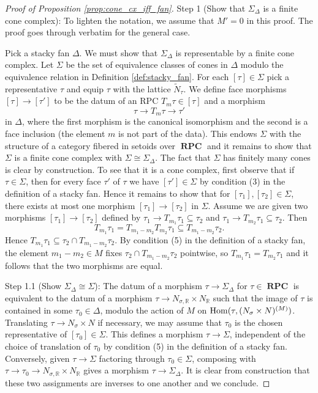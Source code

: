 \documentclass[10pt,a4paper]{amsart}
\DeclareMathOperator{\Hom}{\textup{Hom}}
\DeclareMathOperator{\RPC}{\mathbf{RPC}}
\begin{document}
\begin{proof}[Proof of Proposition \ref{prop:cone_cx_iff_fan}]
	Step 1 (Show that $\Sigma_{\Delta}$ is a finite cone complex): To lighten the notation, we assume that $M'=0$ in this proof. The proof goes through verbatim for the general case.

	Pick a stacky fan $\Delta$. We must show that $\Sigma_{\Delta}$ is representable by a finite cone complex.
	Let $\Sigma$ be the set of equivalence classes of cones in $\Delta$ modulo the equivalence relation in Definition
	\ref{def:stacky_fan}. For each $[\tau]\in \Sigma$ pick a representative $\tau$ and equip $\tau$ with the lattice $\tilde{N}_{\tau}$.
	We define face morphisms $[\tau]\to [\tau']$ to be the datum
	of an RPC $T_m\tau\in [\tau]$ and a morphism
	$$\tau\to T_m\tau\to \tau'$$
	in $\Delta$, where the first
	morphism is the canonical isomorphism and the second is a face inclusion (the element $m$ is not part of the data). This endows
	$\Sigma$ with the structure of a category fibered in setoids over $\RPC$ and it remains to show that $\Sigma$ is a finite cone complex with
	$\Sigma\cong \Sigma_{\Delta}$. The fact that $\Sigma$ has finitely many cones is clear by construction.
	To see that it is a cone complex, first observe that
	if $\tau\in \Sigma$, then for every face $\tau'$ of $\tau$ we have $[\tau']\in \Sigma$ by condition (3) in the definition of a stacky fan. Hence it remains
	to show that for $[\tau_1],[\tau_2]\in \Sigma$, there exists at most one morphism $[\tau_1]\to [\tau_2]$ in $\Sigma$. Assume we are
	given two morphisms $[\tau_1]\to [\tau_2]$ defined by $\tau_1\to T_{m_1}\tau_1\subseteq\tau_2$ and $\tau_1\to T_{m_2}\tau_1\subseteq\tau_2$.
	Then
	$$T_{m_1}\tau_1=T_{m_1-m_2}T_{m_2}\tau_1\subseteq T_{m_1-m_2}\tau_2.$$
	Hence $T_{m_1}\tau_1\subseteq \tau_2\cap T_{m_1-m_2}\tau_2$.
	By condition (5) in the definition of a stacky fan, the element $m_1-m_2\in M$ fixes $\tau_2\cap T_{m_1-m_2}\tau_2$ pointwise,
	so $T_{m_1}\tau_1=T_{m_2}\tau_1$ and it follows that the two morphisms are equal.

	Step 1.1 (Show $\Sigma_{\Delta}\cong \Sigma$): The datum of a morphism $\tau\to \Sigma_{\Delta}$ for $\tau\in \RPC$
	is equivalent to the datum of a morphism $\tau\to N_{\sigma,\mathbb{R}}\times N_{\mathbb{R}}$ such that the image of $\tau$ is contained
	in some $\tau_0\in \Delta$, modulo the action of $M$ on $\Hom(\tau,(N_{\sigma}\times N)^{(M)})$. Translating $\tau\to N_{\sigma}\times N$
	if necessary, we may assume that $\tau_0$ is the chosen representative of $[\tau_0]\in \Sigma$. This defines a morphism $\tau\to \Sigma$,
	independent of the choice of translation of $\tau_0$ by condition (5) in the definition of a stacky fan. Conversely, given $\tau\to \Sigma$ factoring through
	$\tau_0\in \Sigma$, composing with $\tau\to \tau_0\to N_{\sigma,\mathbb{R}}\times N_{\mathbb{R}}$ gives a morphism $\tau\to \Sigma_{\Delta}$. It is clear from
	construction that these two assignments are inverses to one another and we conclude.


\end{proof}
\end{document}
